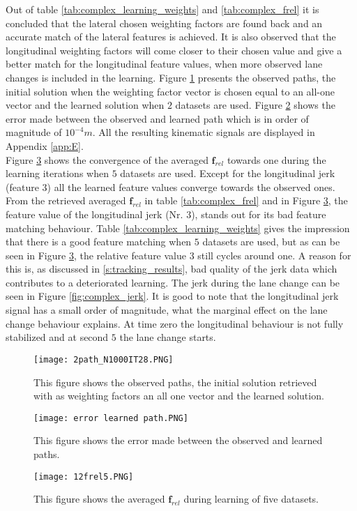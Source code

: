 Out of table \ref{tab:complex_learning_weights} and \ref{tab:complex_frel} it is concluded that the lateral chosen weighting factors are found back and an accurate match of the lateral features is achieved. It is also observed that the longitudinal weighting factors will come closer to their chosen value and give a better match for the longitudinal feature values, when more observed lane changes is included in the learning. Figure \ref{fig:complex_path} presents the observed paths, the initial solution when the weighting factor vector is chosen equal to an all-one vector and the learned solution when $2$ datasets are used. Figure \ref{fig:complex_path_error} shows the error made between the observed and learned path which is in order of magnitude of $10^{-4}m$. All the resulting kinematic signals are displayed in Appendix \ref{app:E}.\\

Figure \ref{fig:complex_convergence} shows the convergence of the averaged $\bm{f}_{rel}$ towards one during the learning iterations when $5$ datasets are used. Except for the longitudinal jerk (feature $3$) all the learned feature values converge towards the observed ones.
From the retrieved averaged $\bm{f}_{rel}$ in table \ref{tab:complex_frel} and in Figure \ref{fig:complex_convergence}, the feature value of the longitudinal jerk (Nr. $3$), stands out for its bad feature matching behaviour. Table \ref{tab:complex_learning_weights} gives the impression that there is a good feature matching when $5$ datasets are used, but as can be seen in Figure \ref{fig:complex_convergence}, the relative feature value $3$ still cycles around one. A reason for this is, as discussed in \ref{s:tracking_results}, bad quality of the jerk data which contributes to a deteriorated learning. The jerk during the lane change can be seen in Figure \ref{fig:complex_jerk}. It is good to note that the longitudinal jerk signal has a small order of magnitude, what the marginal effect on the lane change behaviour explains. At time zero the longitudinal behaviour is not fully stabilized and at second $5$ the lane change starts. 

\begin{figure}[h!]
	\centering
	\texttt{[image: 2path\_N1000IT28.PNG]}
	\caption{This figure shows the observed paths, the initial solution retrieved with as weighting factors an all one vector and the learned solution.}	
	\label{fig:complex_path}
\end{figure}

\begin{figure}[h!]
	\centering
	\texttt{[image: error learned path.PNG]}
	\caption{This figure shows the error made between the observed and learned paths.}	
	\label{fig:complex_path_error}
\end{figure}
\begin{figure}[h!]
	\centering
	\texttt{[image: 12frel5.PNG]}
	\caption{This figure shows the averaged $\bm{f}_{rel}$ during learning of five datasets.}	
	\label{fig:complex_convergence}
\end{figure}

